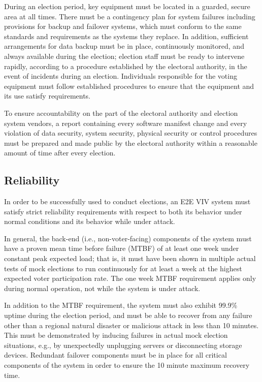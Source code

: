 During an election period, key equipment must be located in a guarded,
secure area at all times. There must be a contingency plan for system
failures including provisions for backup and failover systems, which
must conform to the same standards and requirements as the systems
they replace. In addition, sufficient arrangements for data backup
must be in place, continuously monitored, and always available during
the election; election staff must be ready to intervene rapidly,
according to a procedure established by the electoral authority, in
the event of incidents during an election. Individuals responsible for
the voting equipment must follow established procedures to ensure that
the equipment and its use satisfy requirements.
 
To ensure accountability on the part of the electoral authority and
election system vendors, a report containing every software manifest
change and every violation of data security, system security, physical
security or control procedures must be prepared and made public by the
electoral authority within a reasonable amount of time after every
election.

\subsection{Reliability}

In order to be successfully used to conduct elections, an E2E VIV
system must satisfy strict reliability requirements with respect to
both its behavior under normal conditions and its behavior while under
attack.

In general, the back-end (i.e., non-voter-facing) components of the
system must have a proven mean time before failure (MTBF) of at least
one week under constant peak expected load; that is, it must have been
shown in multiple actual tests of mock elections to run continuously
for at least a week at the highest expected voter participation
rate. The one week MTBF requirement applies only during normal
operation, not while the system is under attack.

In addition to the MTBF requirement, the system must also exhibit
99.9\% uptime during the election period, and must be able to recover
from any failure other than a regional natural disaster or malicious
attack in less than 10 minutes. This must be demonstrated by inducing
failures in actual mock election situations, e.g., by unexpectedly
unplugging servers or disconnecting storage devices. Redundant
failover components must be in place for all critical components of
the system in order to ensure the 10 minute maximum recovery time.

